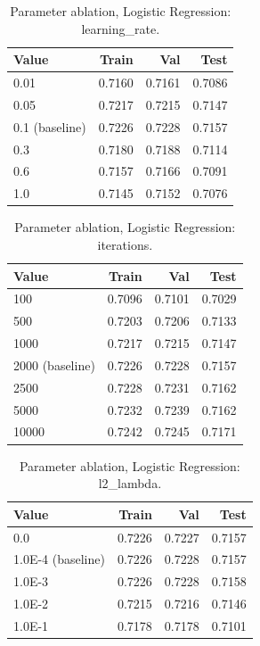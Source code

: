 
\begin{table}[ht]
\centering
\small
\caption{Parameter ablation, Logistic Regression: learning\_rate.}
\label{tab:ablation-logistic-learning-rate}
\begin{tabular}{lrrr}
\toprule
Value & Train & Val & Test \\
\midrule
0.01 & 0.7160 & 0.7161 & 0.7086 \\
0.05 & 0.7217 & 0.7215 & 0.7147 \\
0.1 (baseline) & 0.7226 & 0.7228 & 0.7157 \\
0.3 & 0.7180 & 0.7188 & 0.7114 \\
0.6 & 0.7157 & 0.7166 & 0.7091 \\
1.0 & 0.7145 & 0.7152 & 0.7076 \\
\bottomrule
\end{tabular}
\end{table}

\begin{table}[ht]
\centering
\small
\caption{Parameter ablation, Logistic Regression: iterations.}
\label{tab:ablation-logistic-iterations}
\begin{tabular}{lrrr}
\toprule
Value & Train & Val & Test \\
\midrule
100 & 0.7096 & 0.7101 & 0.7029 \\
500 & 0.7203 & 0.7206 & 0.7133 \\
1000 & 0.7217 & 0.7215 & 0.7147 \\
2000 (baseline) & 0.7226 & 0.7228 & 0.7157 \\
2500 & 0.7228 & 0.7231 & 0.7162 \\
5000 & 0.7232 & 0.7239 & 0.7162 \\
10000 & 0.7242 & 0.7245 & 0.7171 \\
\bottomrule
\end{tabular}
\end{table}

\begin{table}[ht]
\centering
\small
\caption{Parameter ablation, Logistic Regression: l2\_lambda.}
\label{tab:ablation-logistic-l2-lambda}
\begin{tabular}{lrrr}
\toprule
Value & Train & Val & Test \\
\midrule
0.0 & 0.7226 & 0.7227 & 0.7157 \\
1.0E-4 (baseline) & 0.7226 & 0.7228 & 0.7157 \\
1.0E-3 & 0.7226 & 0.7228 & 0.7158 \\
1.0E-2 & 0.7215 & 0.7216 & 0.7146 \\
1.0E-1 & 0.7178 & 0.7178 & 0.7101 \\
\bottomrule
\end{tabular}
\end{table}

